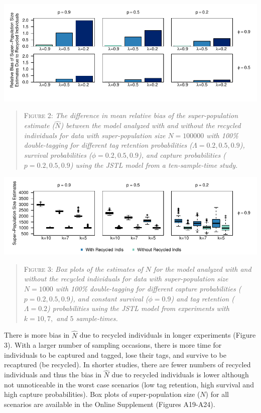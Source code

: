 \documentclass[]{article}
\begin{document}
\includegraphics{RecycledPaper_files/figure-latex/Figure2_N-1.pdf}

\begin{quote}
\textsc{Figure 2:}
\textsl{The difference in mean relative bias of the super-population estimate ($\hat{N}$) between the model analyzed with and without the recycled individuals for data with super-population size $N=100 000$ with 100\% double-tagging for different tag retention probabilities ($\Lambda=0.2,0.5,0.9$), survival probabilities ($\phi=0.2,0.5,0.9$), and capture probabilities ($p=0.2,0.5,0.9$) using the JSTL model from a ten-sample-time study.}
\end{quote}

\includegraphics{RecycledPaper_files/figure-latex/Figure3_N_k-1.pdf}

\begin{quote}
\textsc{Figure 3:}
\textsl{Box plots of the estimates of $N$ for the model analyzed with and without the recycled individuals for data with super-population size $N=1000$ with 100\% double-tagging for different capture probabilities ($p=0.2,0.5,0.9$), and constant survival ($\phi=0.9$) and tag retention ($\Lambda=0.2$) probabilities using the JSTL model from experiments with $k=10, 7,$ and $5$ sample-times. }
\end{quote}

There is more bias in \(\hat{N}\) due to recycled individuals in longer
experiments (Figure 3). With a larger number of sampling occasions,
there is more time for individuals to be captured and tagged, lose their
tags, and survive to be recaptured (be recycled). In shorter studies,
there are fewer numbers of recycled individuals and thus the bias in
\(\hat{N}\) due to recycled individuals is lower although not
unnoticeable in the worst case scenarios (low tag retention, high
survival and high capture probabilities). Box plots of super-population
size (\(N\)) for all scenarios are available in the Online Supplement (Figures
A19-A24).
\end{document}
